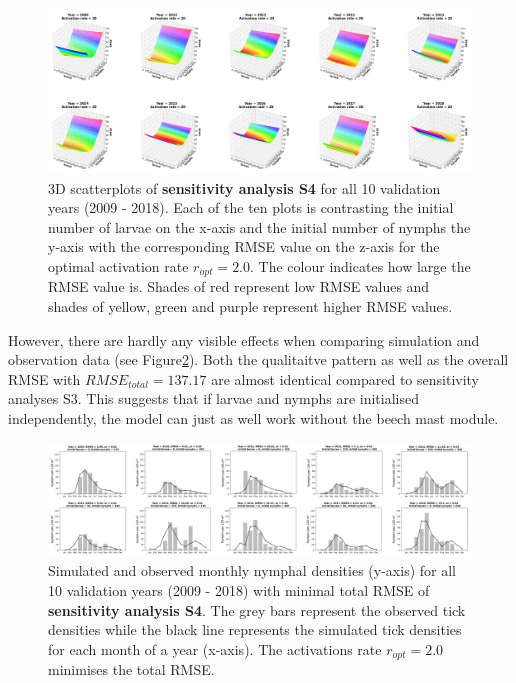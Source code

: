 \documentclass[a4paper, 11pt]{scrartcl}
\begin{document}
\begin{figure}[h!]
\centering
\includegraphics[width=\linewidth]{figures/independent_initial_ticks_without_beech_error}
\caption{3D scatterplots of \textbf{sensitivity analysis S4} for all 10 validation years (2009 - 2018). Each of the ten plots is contrasting the initial number of larvae on the
x-axis and the initial number of nymphs the y-axis with the corresponding RMSE value on the z-axis for the optimal activation rate $r_{opt} = 2.0$. The colour indicates how large
the RMSE value is. Shades of red represent low RMSE values and shades of yellow, green and purple represent higher RMSE values.}
\label{fig:independent_initial_ticks_without_beech_error}
\end{figure}

However, there are hardly any visible effects when comparing simulation and observation data (see Figure\ref{fig:independent_initial_ticks_without_beech}). Both the qualitaitve
pattern as well as the overall RMSE with $RMSE_{total} = 137.17$ are almost identical compared to sensitivity analyses S3. This suggests that if larvae and nymphs are
initialised independently, the model can just as well work without the beech mast module.


\begin{figure}[h!]
\centering
\includegraphics[width=\linewidth]{figures/independent_initial_ticks_without_beech}
\caption{Simulated and observed monthly nymphal densities (y-axis) for all 10 validation years (2009 - 2018) with minimal total RMSE of \textbf{sensitivity analysis S4}. The
grey bars represent the observed tick densities while the black line represents the simulated tick densities for each month of a year (x-axis). The activations rate $r_{opt}= 2.0$
minimises the total RMSE.}
\label{fig:independent_initial_ticks_without_beech}
\end{figure}
\end{document}
